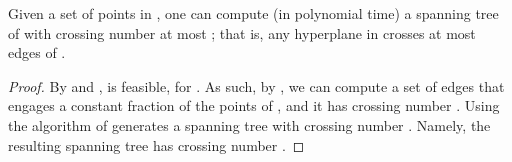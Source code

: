 \documentclass[12pt]{article}
\begin{document}
\begin{theorem}
    Given a set  of  points in , one can compute
    (in polynomial time) a spanning tree  of  with crossing
    number at most ; that is, any hyperplane in
     crosses at most  edges of .
\end{theorem}
\begin{proof}
    By  and ,  is
    feasible, for . As such, by
    , we can compute a set of edges  that engages
    a constant fraction of the points of , and it has
    crossing number .  Using the
    algorithm of  generates a spanning tree with
    crossing number . Namely,
    the resulting spanning tree has crossing number
    .
\end{proof}
\end{document}
